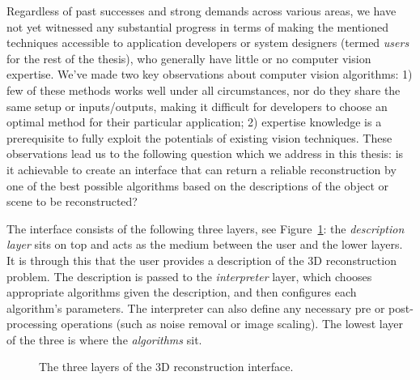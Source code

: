 Regardless of past successes and strong demands across various areas, we have not yet witnessed any substantial progress in terms of making the mentioned techniques accessible to application developers or system designers (termed \textit{users} for the rest of the thesis), who generally have little or no computer vision expertise. We've made two key observations about computer vision algorithms: 1) few of these methods works well under all circumstances, nor do they share the same setup or inputs/outputs, making it difficult for developers to choose an optimal method for their particular application; 2) expertise knowledge is a prerequisite to fully exploit the potentials of existing vision techniques. These observations lead us to the following question which we address in this thesis: is it achievable to create an interface that can return a reliable reconstruction by one of the best possible algorithms based on the descriptions of the object or scene to be reconstructed?

The interface consists of the following three layers, see Figure~\ref{fig:interface_overview}: the \textit{description layer} sits on top and acts as the medium between the user and the lower layers. It is through this that the user provides a description of the 3D reconstruction problem. The description is passed to the \textit{interpreter} layer, which chooses appropriate algorithms given the description, and then configures each algorithm's parameters. The interpreter can also define any necessary pre or post-processing operations (such as noise removal or image scaling). The lowest layer of the three is where the \textit{algorithms} sit.
\begin{figure}[!htbp]
\centering
{}
\caption{The three layers of the 3D reconstruction interface.}
\label{fig:interface_overview}
\end{figure}


